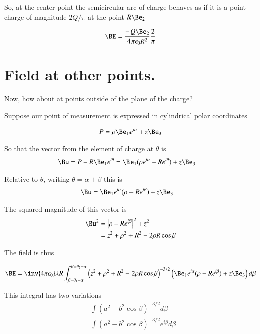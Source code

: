 So, at the center point the semicircular arc of charge behaves as if it is a point charge of magnitude $2Q/\pi$ at the point $R \Be_2$

\begin{align}\label{eqn:chargeArcEl:semicircleAtCenter}
\BE = \frac{-Q \Be_2}{ 4 \pi \epsilon_0 R^2 } \frac{2}{\pi}
\end{align}

\section{Field at other points. }

Now, how about at points outside of the plane of the charge?

Suppose our point of measurement is expressed in cylindrical polar coordinates

\begin{align*}
P = \rho \Be_1 e^{i\alpha} + z \Be_3
\end{align*}

So that the vector from the element of charge at $\theta$ is
\begin{align*}
\Bu = P - R \Be_1 e^{i\theta} &= \Be_1 (\rho e^{i\alpha} -R e^{i\theta}) + z \Be_3
\end{align*}

Relative to $\theta$, writing $\theta = \alpha + \beta$ this is
\begin{align*}
\Bu &= \Be_1 e^{i\alpha} (\rho -R e^{i\beta}) + z \Be_3
\end{align*}

The squared magnitude of this vector is
\begin{align*}
\Bu^2
&= \Abs{\rho -R e^{i\beta}}^2 + z^2 \\
&= z^2 + \rho^2 + R^2 -2 \rho R \cos\beta \\
\end{align*}

The field is thus

\begin{align}\label{eqn:chargeArcEl:fieldAtP}
\BE = \inv{4 \pi \epsilon_0} \lambda R 
\int_{\beta=\theta_1 -\alpha}^{\beta=\theta_2-\alpha}
{
\left(z^2 + \rho^2 + R^2 -2 \rho R \cos\beta\right)
}^{-3/2}
\left(\Be_1 e^{i\alpha} (\rho -R e^{i\beta}) + z \Be_3\right)
d\beta
\end{align}

This integral has two variations
\begin{align*}
&\int { \left(a^2 - b^2\cos\beta\right) }^{-3/2} d\beta \\
&\int { \left(a^2 - b^2\cos\beta\right) }^{-3/2} e^{i\beta} d\beta \\
\end{align*}

